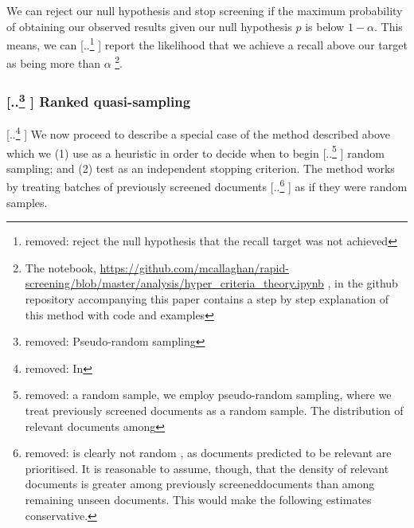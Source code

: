 \documentclass{bmcart}
\providecommand{\DIFadd}[1]{{\protect\color{blue} \sf #1}} %
\providecommand{\DIFdel}[1]{{\protect\color{red} [..\footnote{removed: #1} ]}} %
\providecommand{\DIFaddbegin}{} %
\providecommand{\DIFaddend}{} %
\providecommand{\DIFdelbegin}{} %
\providecommand{\DIFdelend}{} %
\newcommand{\DIFscaledelfig}{0.5}
\newlength{\DIFdelgraphicswidth} %
\newlength{\DIFdelgraphicsheight} %
\newcommand{\DIFaddincludegraphics}[2][]{{\color{blue}\fbox{\DIFOincludegraphics[#1]{#2}}}} %
\newcommand{\DIFdelincludegraphics}[2][]{%
\sbox{\DIFdelgraphicsbox}{\DIFOincludegraphics[#1]{#2}}%
\settoboxwidth{\DIFdelgraphicswidth}{\DIFdelgraphicsbox} %
\settoboxtotalheight{\DIFdelgraphicsheight}{\DIFdelgraphicsbox} %
\scalebox{\DIFscaledelfig}{%
\parbox[b]{\DIFdelgraphicswidth}{\usebox{\DIFdelgraphicsbox}\\[-\baselineskip] \rule{\DIFdelgraphicswidth}{0em}}\llap{\resizebox{\DIFdelgraphicswidth}{\DIFdelgraphicsheight}{%
\setlength{\unitlength}{\DIFdelgraphicswidth}%
\begin{picture}(1,1)%
\thicklines\linethickness{2pt} %
{\color[rgb]{1,0,0}\put(0,0){\framebox(1,1){}}}%
{\color[rgb]{1,0,0}\put(0,0){\line( 1,1){1}}}%
{\color[rgb]{1,0,0}\put(0,1){\line(1,-1){1}}}%
\end{picture}%
}\hspace*{3pt}}} %
} %
\DeclareRobustCommand{\DIFaddbegin}{\DIFOaddbegin \let\includegraphics\DIFaddincludegraphics} %
\DeclareRobustCommand{\DIFaddend}{\DIFOaddend \let\includegraphics\DIFOincludegraphics} %
\DeclareRobustCommand{\DIFdelbegin}{\DIFOdelbegin \let\includegraphics\DIFdelincludegraphics} %
\DeclareRobustCommand{\DIFdelend}{\DIFOaddend \let\includegraphics\DIFOincludegraphics} %
\begin{document}
	\DIFadd{We can reject our null hypothesis and stop screening if the maximum probability of obtaining our observed results given our null hypothesis $p$ is below $1-\alpha$. This means}\DIFaddend , we can \DIFdelbegin \DIFdel{reject the null hypothesis that the recall target was not achieved}\DIFdelend \DIFaddbegin \DIFadd{report the likelihood that we achieve a recall above our target as being more than $\alpha$ }\footnote{\DIFadd{The notebook, }\url{https://github.com/mcallaghan/rapid-screening/blob/master/analysis/hyper_criteria_theory.ipynb}\DIFadd{, in the github repository accompanying this paper contains a step by step explanation of this method with code and examples}}\DIFaddend .

	
	
	\subsubsection*{\DIFdelbegin \DIFdel{Pseudo-random sampling}\DIFdelend \DIFaddbegin \DIFadd{Ranked quasi-sampling}\DIFaddend }

	\DIFdelbegin \DIFdel{In }\DIFdelend \DIFaddbegin \DIFadd{We now proceed to describe a special case of the method described above which we (1) use as a heuristic in }\DIFaddend order to decide when to begin \DIFdelbegin \DIFdel{a random sample, we employ pseudo-random sampling, where we treat previously screened documents as a random sample. The distribution of relevant documents among }\DIFdelend \DIFaddbegin \DIFadd{random sampling; and (2) test as an independent stopping criterion. The method works by treating batches of }\DIFaddend previously screened documents \DIFdelbegin \DIFdel{is clearly not random , as documents predicted to be relevant are prioritised. It is reasonable to assume, though, that the density of relevant documents is greater among previously screeneddocuments than among remaining unseen documents. This would make the following estimates conservative.
	}\DIFdelend \DIFaddbegin \DIFadd{as if they were random samples.
	}\DIFaddend 
\end{document}
